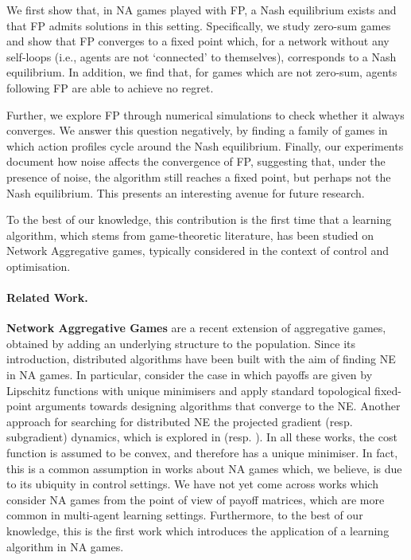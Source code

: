 \documentclass{article}
\theoremstyle{definition}
\begin{document}
  We first show that, in NA games played with FP, a Nash equilibrium
  exists and that FP admits solutions in this setting. Specifically,
  we study zero-sum games and show that FP converges to a fixed point
  which, for a network without any self-loops (i.e., agents are not
  `connected' to themselves), corresponds to a Nash equilibrium. In
  addition, we find that, for games which are not zero-sum, agents
  following FP are able to achieve no regret.

  Further, we explore FP through numerical simulations to check
  whether it always converges. We answer this question
  negatively, by finding a family of games in which action profiles cycle
  around the Nash equilibrium. Finally, our experiments document how
  noise affects the convergence of FP, suggesting that,
  under the presence of noise, the algorithm still reaches a fixed
  point, but perhaps not the Nash equilibrium. This presents an
  interesting avenue for future research.
  
  To the best of our knowledge, this contribution is the first time that a
  learning algorithm, which stems from game-theoretic literature, has
  been studied on Network Aggregative games, typically considered
  in the context of control and optimisation.

\paragraph{Related Work.}

\textbf{Network Aggregative Games}
are a recent extension \cite{Parise2015}
of aggregative games, obtained by adding an underlying structure to
the population. Since its introduction, distributed algorithms have
been built with the aim of finding NE in NA games. In particular,
\cite{Parise2015, Parise2020} consider the case in which payoffs are
given by Lipschitz functions with unique minimisers and apply standard
topological fixed-point arguments towards designing algorithms that
converge to the NE. Another approach for searching for distributed NE the
projected gradient (resp. subgradient) dynamics, which is explored in
\cite{Zhu2021} (resp. \cite{Shokri2020, Shokri2021}). In all these
works, the cost function is assumed to be convex, and therefore has a
unique minimiser. In fact, this is a common assumption in works
about NA games \cite{Zhu2021, Lei2020} which, we believe, is due
to its ubiquity in control settings. We have not yet come across works
which consider NA games from the point of view of payoff matrices,
which are more common in multi-agent learning settings.  Furthermore,
to the best of our knowledge, this is the first work which introduces
the application of a learning algorithm in NA games.
\end{document}

